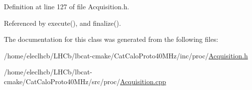 Definition at line 127 of file Acquisition.\+h.



Referenced by execute(), and finalize().



The documentation for this class was generated from the following files\+:\begin{DoxyCompactItemize}
\item 
/home/eleclhcb/\+L\+H\+Cb/lbcat-\/cmake/\+Cat\+Calo\+Proto40\+M\+Hz/inc/proc/\hyperlink{Acquisition_8h}{Acquisition.\+h}\item 
/home/eleclhcb/\+L\+H\+Cb/lbcat-\/cmake/\+Cat\+Calo\+Proto40\+M\+Hz/src/proc/\hyperlink{Acquisition_8cpp}{Acquisition.\+cpp}\end{DoxyCompactItemize}
